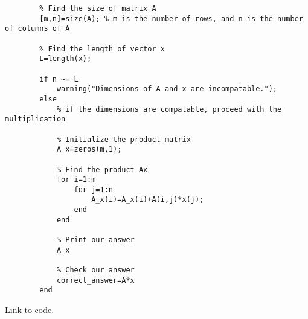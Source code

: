 \documentclass{ximera}
\begin{document}
\begin{example}
\begin{explanation}
\begin{verbatim}
        % Find the size of matrix A
        [m,n]=size(A); % m is the number of rows, and n is the number of columns of A

        % Find the length of vector x
        L=length(x);

        if n ~= L
            warning("Dimensions of A and x are incompatable.");
        else
            % if the dimensions are compatable, proceed with the multiplication

            % Initialize the product matrix
            A_x=zeros(m,1);

            % Find the product Ax 
            for i=1:m
                for j=1:n
                    A_x(i)=A_x(i)+A(i,j)*x(j);
                end
            end

            % Print our answer
            A_x

            % Check our answer
            correct_answer=A*x
        end
    \end{verbatim}

    \href{https://sagecell.sagemath.org/?z=eJxlUU1r20AQvQv0H4aAQU6lYNluY2L2IFoChRx6yckEo0hjexztrtldxSKH_vbOaq0oaXTRzLyPGT1N4NGiyWrckcIaZOkMdVDEUSE2S8hy-AH5DLL5Oo4WkOewgmwBS-6y7zCHfMl4lvfg3CMzuH3iLo4mn31fsXLaQBdHndiwG1vAag1cLAb-Paka3AHB0huC3n24ZSNT9ST8PCmma5iABLI9V7XyGY1nG322KZTsob6ClW5aqawvi_-2Naj27uCR8cYHEaZJN-2Pox2b_hXwEEfAz7k0itQ-ufpFEpUlfXHut3dQGgRSlZan0pXPDd5ceRdsLAb5BNjPr65HudeMihRORlfIuZ2Jb_Nc2TaOTg1VpWOBPypY_VbkqGx8ZJ7Gurqt3CW7QCq2nXhDo20i0zx8UNC-ZzCoig4CtuMcSOR3MrTD6MgjNY4u5glNRXh9KxJKj9PrLjn6PQMHVR2avhi2_zGkHOjWcGz2jOb92JHy84DVyxdKpY3hX7UNM1Fcs4Kd_wE4wcc1&lang=octave&interacts=eJyLjgUAARUAuQ==}{Link to code}.

    \end{explanation}   
    \end{example}
\end{document}
